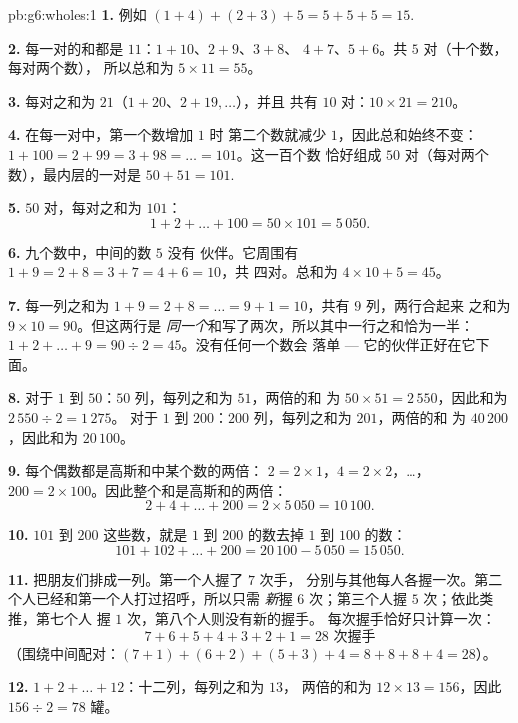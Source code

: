 \begin{solution}{pb:g6:wholes:1}
\textbf{1.} 例如 $(1 + 4) + (2 + 3) + 5 = 5 + 5 + 5 =
15$.

\textbf{2.} 每一对的和都是 $11$：$1 + 10$、$2 + 9$、$3 + 8$、
$4 + 7$、$5 + 6$。共 $5$ 对（十个数，每对两个数），
所以总和为 $5 \times 11 = 55$。

\textbf{3.} 每对之和为 $21$（$1 + 20$、$2 + 19, \dots$），并且
共有 $10$ 对：$10 \times 21 = 210$。

\textbf{4.} 在每一对中，第一个数增加 $1$ 时
第二个数就减少 $1$，因此总和始终不变：
$1 + 100 = 2 + 99 = 3 + 98 = \dots = 101$。这一百个数
恰好组成 $50$ 对（每对两个数），最内层的一对是
$50 + 51 = 101$.

\textbf{5.} $50$ 对，每对之和为 $101$：
\[
1 + 2 + \dots + 100 = 50 \times 101 = 5\,050 .
\]

\textbf{6.} 九个数中，中间的数 $5$ 没有
伙伴。它周围有 $1 + 9 = 2 + 8 = 3 + 7 = 4 + 6 = 10$，共
四对。总和为 $4 \times 10 + 5 = 45$。

\textbf{7.} 每一列之和为 $1 + 9 = 2 + 8 = \dots =
9 + 1 = 10$，共有 $9$ 列，两行合起来
之和为 $9 \times 10 = 90$。但这两行是
\emph{同一个}和写了两次，所以其中一行之和恰为一半：
$1 + 2 + \dots + 9 = 90 \div 2 = 45$。没有任何一个数会
落单 --- 它的伙伴正好在它下面。

\textbf{8.} 对于 $1$ 到 $50$：$50$ 列，每列之和为 $51$，两倍的和
为 $50 \times 51 = 2\,550$，因此和为 $2\,550 \div 2 = 1\,275$。
对于 $1$ 到 $200$：$200$ 列，每列之和为 $201$，两倍的和
为 $40\,200$，因此和为 $20\,100$。

\textbf{9.} 每个偶数都是高斯和中某个数的两倍：
$2 = 2 \times 1$，$4 = 2 \times 2$，\dots，
$200 = 2 \times 100$。因此整个和是高斯和的两倍：
\[
2 + 4 + \dots + 200 = 2 \times 5\,050 = 10\,100 .
\]

\textbf{10.} $101$ 到 $200$ 这些数，就是
$1$ 到 $200$ 的数去掉 $1$ 到 $100$ 的数：
\[
101 + 102 + \dots + 200 = 20\,100 - 5\,050 = 15\,050 .
\]

\textbf{11.} 把朋友们排成一列。第一个人握了 $7$ 次手，
分别与其他每人各握一次。第二个人已经和第一个人打过招呼，所以只需
\emph{新}握 $6$ 次；第三个人握 $5$ 次；依此类推，第七个人
握 $1$ 次，第八个人则没有新的握手。
每次握手恰好只计算一次：
\[
7 + 6 + 5 + 4 + 3 + 2 + 1 = 28 \text{ 次握手}
\]
（围绕中间配对：$(7+1) + (6+2) + (5+3) + 4 =
8 + 8 + 8 + 4 = 28$）。

\textbf{12.} $1 + 2 + \dots + 12$：十二列，每列之和为 $13$，
两倍的和为 $12 \times 13 = 156$，因此
$156 \div 2 = 78$ 罐。


\end{solution}
